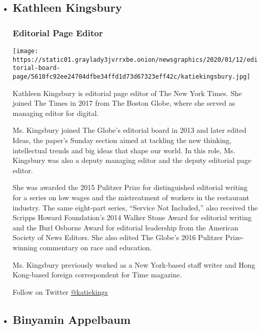 \begin{itemize}
\item
  \hypertarget{kathleen-kingsbury}{%
  \subsection{Kathleen Kingsbury}\label{kathleen-kingsbury}}

  \hypertarget{editorial-page-editor}{%
  \subsubsection{Editorial Page Editor}\label{editorial-page-editor}}

  \texttt{[image: https://static01.graylady3jvrrxbe.onion/newsgraphics/2020/01/12/editorial-board-page/5610fc92ee24704dfbe34ffd1d73d67323eff42c/katiekingsbury.jpg]}

  Kathleen Kingsbury is editorial page editor of The New York Times. She
  joined The Times in 2017 from The Boston Globe, where she served as
  managing editor for digital.

  Ms. Kingsbury joined The Globe's editorial board in 2013 and later
  edited Ideas, the paper's Sunday section aimed at tackling the new
  thinking, intellectual trends and big ideas that shape our world. In
  this role, Ms. Kingsbury was also a deputy managing editor and the
  deputy editorial page editor.

  She was awarded the 2015 Pulitzer Prize for distinguished editorial
  writing for a series on low wages and the mistreatment of workers in
  the restaurant industry. The same eight-part series, ``Service Not
  Included,'' also received the Scripps Howard Foundation's 2014 Walker
  Stone Award for editorial writing and the Burl Osborne Award for
  editorial leadership from the American Society of News Editors. She
  also edited The Globe's 2016 Pulitzer Prize-winning commentary on race
  and education.

  Ms. Kingsbury previously worked as a New York-based staff writer and
  Hong Kong-based foreign correspondent for Time magazine.

  Follow on Twitter \href{http://twitter.com/katiekings}{@katiekings}
\item
  \hypertarget{binyamin-appelbaum}{%
  \subsection{Binyamin Appelbaum}\label{binyamin-appelbaum}}


\end{itemize}
